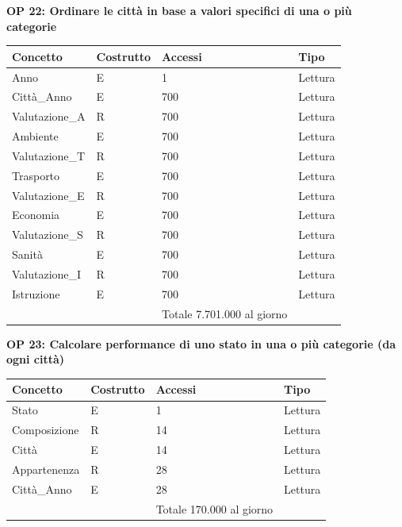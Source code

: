 \documentclass[a4paper,12pt]{report}
\begin{document}
            \textbf{OP 22: Ordinare le città in base a valori specifici di una o più categorie}
        	\begin{table}[H]
            \centering
             \begin{tabular}{||l l l l||}
             \hline
             Concetto & Costrutto & Accessi & Tipo \\ [0.5ex] 
             \hline\hline
             Anno & E & 1 & Lettura \\ 
             Città\_Anno & E & 700 & Lettura \\ 
             Valutazione\_A & R & 700 & Lettura \\ 
             Ambiente & E & 700 & Lettura \\
             Valutazione\_T & R & 700 & Lettura \\ 
             Trasporto & E & 700 & Lettura \\
             Valutazione\_E & R & 700 & Lettura \\ 
             Economia & E & 700 & Lettura \\
             Valutazione\_S & R & 700 & Lettura \\ 
             Sanità & E & 700 & Lettura \\
             Valutazione\_I & R & 700 & Lettura \\ 
             Istruzione & E & 700 & Lettura \\
             \hline
                &   & Totale  7.701.000 al giorno &  \\ [1ex] 
             \hline
             \end{tabular}
            \end{table}

            \textbf{OP 23: Calcolare performance di uno stato in una o più categorie (da ogni città)}
        	\begin{table}[H]
            \centering
             \begin{tabular}{||l l l l||}
             \hline
             Concetto & Costrutto & Accessi & Tipo \\ [0.5ex] 
             \hline\hline
             Stato & E & 1 & Lettura \\ 
             Composizione & R & 14 & Lettura \\ 
             Città & E & 14 & Lettura \\ 
             Appartenenza & R & 28 & Lettura \\ 
             Città\_Anno & E & 28 & Lettura \\ 
             \hline
                &   & Totale  170.000 al giorno &  \\ [1ex] 
             \hline
             \end{tabular}
            \end{table}
        
\end{document}
